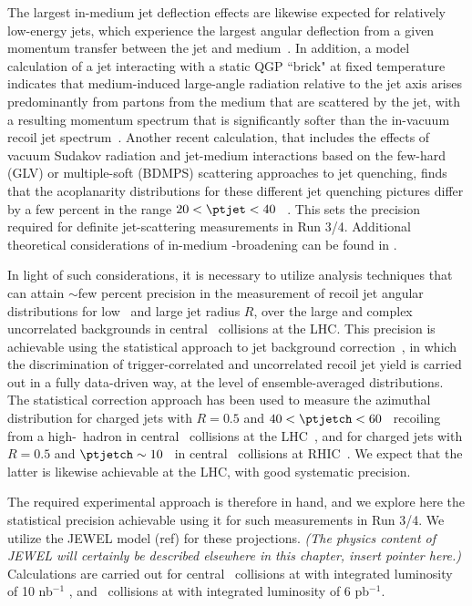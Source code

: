 The largest in-medium jet deflection effects are likewise expected for relatively low-energy jets, which experience the largest angular deflection from a given momentum transfer between the jet and medium~\cite{DEramo:2018eoy,Gyulassy:2018qhr}. In addition, a model calculation of a jet interacting with a static QGP ``brick" at fixed temperature indicates that medium-induced large-angle radiation relative to the jet axis arises predominantly from partons from the medium that are scattered by the jet, with a resulting momentum spectrum that is significantly softer than the in-vacuum recoil jet spectrum~\cite{DEramo:2018eoy}. Another recent calculation, that includes the effects of vacuum Sudakov radiation and jet-medium interactions based on the few-hard (GLV) or multiple-soft (BDMPS) scattering approaches to jet quenching, finds that the acoplanarity distributions for these different jet quenching pictures differ by a few percent in the range $20<\ptjet<40$ \gevc~\cite{Gyulassy:2018qhr}. This sets the precision required for definite jet-scattering measurements in Run 3/4. Additional theoretical considerations of in-medium \pT-broadening can be found in \cite{Zakharov:2018rst,Ghiglieri:2018ltw}.

In light of such considerations, it is necessary to utilize analysis techniques that can attain $\sim$few percent precision in the measurement of recoil jet angular distributions for low \ptjet\ and large jet radius $R$, over the large and complex uncorrelated backgrounds in central \PbPb\ collisions at the LHC. This precision is achievable using the statistical approach to jet background correction~\cite{Adam:2015doa,Adamczyk:2017yhe}, in which the discrimination of trigger-correlated and uncorrelated recoil jet yield is carried out in a fully data-driven way, at the level of ensemble-averaged distributions. The statistical correction approach has been used to measure the azimuthal distribution for charged jets with $R=0.5$ and $40<\ptjetch<60$ \gevc\ recoiling from a high-\pt\ hadron in central \PbPb\ collisions at the LHC~\cite{Adam:2015doa}, and for charged jets with $R=0.5$ and $\ptjetch\sim10$ \gevc\ in central \AuAu\ collisions at RHIC~\cite{Adamczyk:2017yhe}. We expect that the latter is likewise achievable at the LHC, with good systematic precision. 

The required experimental approach is therefore in hand, and we explore here the statistical precision achievable using it for such measurements in Run 3/4. 
We utilize the JEWEL model (ref) for these projections. {\it (The physics content of JEWEL will certainly be described elsewhere in this chapter, insert pointer here.)} Calculations are carried out for central \PbPb\ collisions at  with integrated luminosity of 10 nb$^{-1}$ , and \pp\ collisions at  with integrated luminosity of 6 pb$^{-1}$. 

